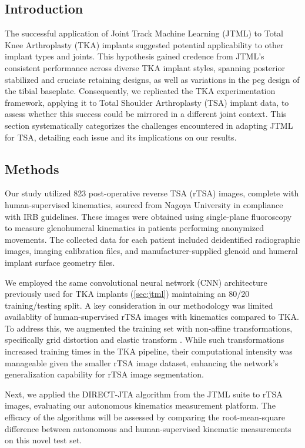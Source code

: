 \subsection{Introduction}
The successful application of Joint Track Machine Learning (JTML) to Total Knee Arthroplasty (TKA) implants suggested potential applicability to other implant types and joints.
This hypothesis gained credence from JTML's consistent performance across diverse TKA implant styles, spanning posterior stabilized and cruciate retaining designs, as well as variations in the peg design of the tibial baseplate.
Consequently, we replicated the TKA experimentation framework, applying it to Total Shoulder Arthroplasty (TSA) implant data, to assess whether this success could be mirrored in a different joint context.
This section systematically categorizes the challenges encountered in adapting JTML for TSA, detailing each issue and its implications on our results.

\subsection{Methods}
Our study utilized 823 post-operative reverse TSA (rTSA) images, complete with human-supervised kinematics, sourced from Nagoya University in compliance with IRB guidelines.
These images were obtained using single-plane fluoroscopy to measure glenohumeral kinematics in patients performing anonymized movements.
The collected data for each patient included deidentified radiographic images, imaging calibration files, and manufacturer-supplied glenoid and humeral implant surface geometry files.


We employed the same convolutional neural network (CNN) architecture previously used for TKA implants \cite{wangDeepHighResolutionRepresentation2020} (\cref{sec:jtml}) maintaining an 80/20 training/testing split.
A key consideration in our methodology was limited availablity of human-supervised rTSA images with kinematics compared to TKA.
To address this, we augmented the training set with non-affine transformations, specifically grid distortion and elastic transform \cite{buslaevAlbumentationsFastFlexible2020}.
While such transformations increased training times in the TKA pipeline, their computational intensity was manageable given the smaller rTSA image dataset, enhancing the network's generalization capability for rTSA image segmentation.

Next, we applied the DIRECT-JTA algorithm from the JTML suite to rTSA images, evaluating our autonomous kinematics measurement platform.
The efficacy of the algorithms will be assessed by comparing the root-mean-square difference between autonomous and human-supervised kinematic measurements on this novel test set.

